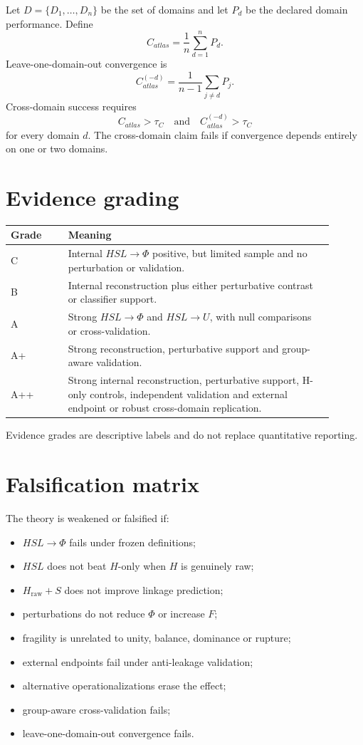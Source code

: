\documentclass[11pt,a4paper]{article}
\newcommand{\Hraw}{H_{\mathrm{raw}}}
\begin{document}
Let $D=\{D_1,\ldots,D_n\}$ be the set of domains and let $P_d$ be the declared domain performance.
Define
\[
C_{atlas}=\frac{1}{n}\sum_{d=1}^n P_d.
\]
Leave-one-domain-out convergence is
\[
C_{atlas}^{(-d)}=
\frac{1}{n-1}\sum_{j\neq d}P_j.
\]
Cross-domain success requires
\[
C_{atlas}>\tau_C
\quad\text{and}\quad
C_{atlas}^{(-d)}>\tau_C
\]
for every domain $d$.
The cross-domain claim fails if convergence depends entirely on one or two domains.

\section{Evidence grading}

\begin{longtable}{p{0.16\linewidth}p{0.74\linewidth}}
\toprule
\textbf{Grade} & \textbf{Meaning}\\
\midrule
C & Internal $HSL\rightarrow\Phi$ positive, but limited sample and no perturbation or validation.\\
B & Internal reconstruction plus either perturbative contrast or classifier support.\\
A & Strong $HSL\rightarrow\Phi$ and $HSL\rightarrow U$, with null comparisons or cross-validation.\\
A+ & Strong reconstruction, perturbative support and group-aware validation.\\
A++ & Strong internal reconstruction, perturbative support, H-only controls, independent validation and external endpoint or robust cross-domain replication.\\
\bottomrule
\end{longtable}
Evidence grades are descriptive labels and do not replace quantitative reporting.

\section{Falsification matrix}

The theory is weakened or falsified if:
\begin{itemize}
\item $HSL\rightarrow\Phi$ fails under frozen definitions;
\item $HSL$ does not beat $H$-only when $H$ is genuinely raw;
\item $\Hraw+S$ does not improve linkage prediction;
\item perturbations do not reduce $\Phi$ or increase $F$;
\item fragility is unrelated to unity, balance, dominance or rupture;
\item external endpoints fail under anti-leakage validation;
\item alternative operationalizations erase the effect;
\item group-aware cross-validation fails;
\item leave-one-domain-out convergence fails.
\end{itemize}
\end{document}
